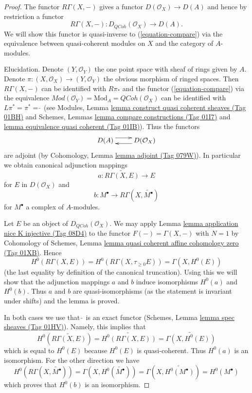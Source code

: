 \documentclass{amsart}
\theoremstyle{plain}
\theoremstyle{definition}
\theoremstyle{remark}
\numberwithin{equation}{subsection}
\def\QCoh{\mathit{QCoh}}
\begin{document}
\begin{proof}
The functor $R\Gamma(X, -)$ gives a functor
$D(\mathcal{O}_X) \to D(A)$ and hence by restriction a functor
\begin{equation}
\label{equation-back}
R\Gamma(X, -) : D_\QCoh(\mathcal{O}_X) \longrightarrow D(A).
\end{equation}
We will show this functor is quasi-inverse to (\ref{equation-compare})
via the equivalence between quasi-coherent modules on $X$ and
the category of $A$-modules.

\medskip\noindent
Elucidation. Denote $(Y, \mathcal{O}_Y)$ the one point space with sheaf
of rings given by $A$. Denote
$\pi : (X, \mathcal{O}_X) \to (Y, \mathcal{O}_Y)$
the obvious morphism of ringed spaces.
Then $R\Gamma(X, -)$ can be identified with $R\pi_*$ and the functor
(\ref{equation-compare}) via the equivalence
$\textit{Mod}(\mathcal{O}_Y) = \text{Mod}_A = \QCoh(\mathcal{O}_X)$
can be identified with $L\pi^* = \pi^* = \widetilde{\ }$ (see
Modules, Lemma \href{https://stacks.math.columbia.edu/tag/01BH}{lemma construct quasi coherent sheaves (Tag 01BH)} and
Schemes, Lemmas \href{https://stacks.math.columbia.edu/tag/01I7}{lemma compare constructions (Tag 01I7)} and
\href{https://stacks.math.columbia.edu/tag/01IB}{lemma equivalence quasi coherent (Tag 01IB)}). Thus the functors
$$
\xymatrix{
D(A) \ar@<1ex>[r] & D(\mathcal{O}_X) \ar@<1ex>[l]
}
$$
are adjoint (by Cohomology, Lemma \href{https://stacks.math.columbia.edu/tag/079W}{lemma adjoint (Tag 079W)}). In
particular we obtain canonical adjunction mappings
$$
a : \widetilde{R\Gamma(X, E)} \longrightarrow E
$$
for $E$ in $D(\mathcal{O}_X)$ and
$$
b : M^\bullet \longrightarrow R\Gamma(X, \widetilde{M^\bullet})
$$
for $M^\bullet$ a complex of $A$-modules.

\medskip\noindent
Let $E$ be an object of $D_\QCoh(\mathcal{O}_X)$. We may apply
Lemma \href{https://stacks.math.columbia.edu/tag/08D4}{lemma application nice K injective (Tag 08D4)}
to the functor $F(-) = \Gamma(X, -)$
with $N = 1$ by Cohomology of Schemes, Lemma
\href{https://stacks.math.columbia.edu/tag/01XB}{lemma quasi coherent affine cohomology zero (Tag 01XB)}.
Hence
$$
H^0(R\Gamma(X, E)) = H^0(R\Gamma(X, \tau_{\geq 0}E)) = \Gamma(X, H^0(E))
$$
(the last equality by definition of the canonical truncation).
Using this we will show that the adjunction mappings $a$ and $b$
induce isomorphisms $H^0(a)$ and $H^0(b)$. Thus $a$ and $b$
are quasi-isomorphisms (as the statement is invariant under shifts)
and the lemma is proved.

\medskip\noindent
In both cases we use that $\widetilde{\ }$ is an exact functor
(Schemes, Lemma \href{https://stacks.math.columbia.edu/tag/01HV}{lemma spec sheaves (Tag 01HV)}). Namely, this
implies that
$$
H^0\left(\widetilde{R\Gamma(X, E)}\right) =
\widetilde{H^0(R\Gamma(X, E))} =
\widetilde{\Gamma(X, H^0(E))}
$$
which is equal to $H^0(E)$ because $H^0(E)$ is quasi-coherent. Thus
$H^0(a)$ is an isomorphism. For the other direction we have
$$
H^0(R\Gamma(X, \widetilde{M^\bullet})) =
\Gamma(X, H^0(\widetilde{M^\bullet})) =
\Gamma(X, \widetilde{H^0(M^\bullet)}) =
H^0(M^\bullet)
$$
which proves that $H^0(b)$ is an isomorphism.
\end{proof}
\end{document}

